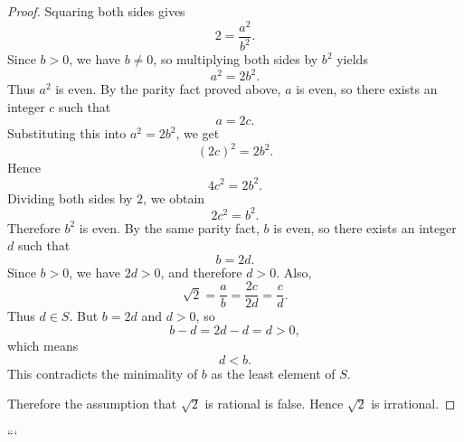 \begin{proof}
Squaring both sides gives
\[
2=\frac{a^2}{b^2}.
\]
Since \(b>0\), we have \(b\neq 0\), so multiplying both sides by \(b^2\) yields
\[
a^2=2b^2.
\]
Thus \(a^2\) is even. By the parity fact proved above, \(a\) is even, so there
exists an integer \(c\) such that
\[
a=2c.
\]
Substituting this into \(a^2=2b^2\), we get
\[
(2c)^2=2b^2.
\]
Hence
\[
4c^2=2b^2.
\]
Dividing both sides by \(2\), we obtain
\[
2c^2=b^2.
\]
Therefore \(b^2\) is even. By the same parity fact, \(b\) is even, so there
exists an integer \(d\) such that
\[
b=2d.
\]
Since \(b>0\), we have \(2d>0\), and therefore \(d>0\). Also,
\[
\sqrt{2}=\frac{a}{b}=\frac{2c}{2d}=\frac{c}{d}.
\]
Thus \(d\in S\). But \(b=2d\) and \(d>0\), so
\[
b-d=2d-d=d>0,
\]
which means
\[
d<b.
\]
This contradicts the minimality of \(b\) as the least element of \(S\).

Therefore the assumption that \(\sqrt{2}\) is rational is false. Hence
\(\sqrt{2}\) is irrational.
\end{proof}
```